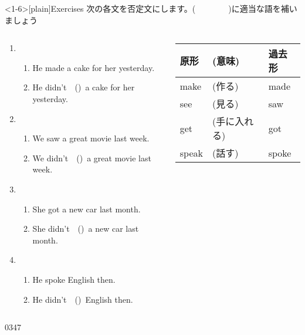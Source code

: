 \documentclass[aspectratio=169,xcolor={dvipsnames,table}]{beamer}
\newcommand{\myaudio}[1]{\href{#1}{\faVolumeUp}}
\begin{document}
\begin{frame}<1-6>[plain]{Exercises}
 次の各文を否定文にします。(~~~~~~~~)に適当な語を補いましょう

\begin{columns}
\begin{column}{.6\textwidth}
\begin{enumerate}
 \item \begin{enumerate}
	\item He made a cake for her yesterday.
	\item He didn't~~()\,\,\,a cake for her yesterday.
       \end{enumerate}
 \item \begin{enumerate}
	\item We saw a great movie last week.
	\item We didn't~~()\,\,\,a great movie last week.
       \end{enumerate}
 \item \begin{enumerate}
	\item She got a new car last month.
	\item She didn't~~()\,\,\,a new car last month.
       \end{enumerate}
 \item \begin{enumerate}
	\item He spoke English then.
	\item He didn't~~()\,\,\,English then.
       \end{enumerate}
\end{enumerate}
\end{column}
\begin{column}{.35\textwidth}
{
\begin{tabular}{lll}\toprule
{\small 原形}&{\small (意味)}&{\small 過去形}\\\midrule
{make}&{{\small (作る)}}&{made}\\
{see}&{{\small (見る)}}&{saw}\\
{get}&{{\small (手に入れる)}}&{got}\\
{speak}&{{\small(話す)}}&{spoke}\\
\bottomrule
\end{tabular}}%

\end{column}
\end{columns}
\hfill{\tiny 0347}\,{\scriptsize \myaudio{./audio/026_past_didnot_07.mp3}}

\end{frame}
\end{document}
